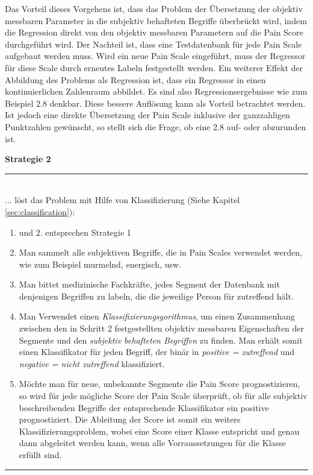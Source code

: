 Das Vorteil dieses Vorgehens ist, dass das Problem der Übersetzung der objektiv messbaren Parameter in die subjektiv behafteten Begriffe überbrückt wird, indem die Regression direkt von den objektiv messbaren Parametern auf  die Pain Score durchgeführt wird. Der Nachteil ist, dass eine Testdatenbank für jede Pain Scale aufgebaut werden muss. Wird ein neue Pain Scale eingeführt, muss der Regressor für diese Scale durch erneutes Labeln festgestellt werden. Ein weiterer Effekt der Abbildung des Problems als Regression ist, dass ein Regressor in einen kontinuierlichen Zahlenraum abbildet. Es sind also Regressionsergebnisse wie zum Beispiel $2.8$ denkbar. Diese \glqq bessere Auflösung\grqq{} kann als Vorteil betrachtet werden. Ist jedoch eine direkte Übersetzung der Pain Scale inklusive der ganzzahligen Punktzahlen gewünscht, so stellt sich die Frage, ob eine $2.8$ auf- oder abzurunden ist.

\vspace{5mm}

\textbf{Strategie 2} \noindent\rule{0.83\linewidth}{0.3pt} \\
... löst das Problem mit Hilfe von Klassifizierung (Siehe Kapitel \ref{sec:classification}):
\begin{enumerate}
	\item und 2. entsprechen Strategie 1
	\item Man sammelt alle subjektiven Begriffe, die in Pain Scales verwendet werden, wie zum Beispiel \glqq murmelnd\grqq , \glqq energisch\grqq , usw.
	\item Man bittet medizinische Fachkräfte, jedes Segment der Datenbank mit denjenigen Begriffen zu labeln, die die jeweilige Person für zutreffend hält. 
	\item  Man Verwendet einen \emph{Klassifizierungsgorithmus}, um einen Zusammenhang zwischen den in Schritt 2 festgestellten objektiv messbaren Eigenschaften der Segmente und den \emph{subjektiv behafteten Begriffen} zu finden. Man erhält somit einen Klassifikator für jeden Begriff, der binär in \emph{positive = zutreffend} und \emph{negative = nicht zutreffend} klassifiziert.
	\item Möchte man für neue, unbekannte Segmente die Pain Score prognostizieren, so wird für jede mögliche Score der Pain Scale überprüft, ob für alle subjektiv beschreibenden Begriffe der entsprechende Klassifikator ein positive prognostiziert. Die Ableitung der Score ist somit ein weiters Klassifizierungsproblem, wobei eine Score einer Klasse entspricht und genau dann abgeleitet werden kann, wenn alle Vorraussetzungen für die Klasse erfüllt sind.
\end{enumerate}
\noindent\rule{\linewidth}{0.3pt}

